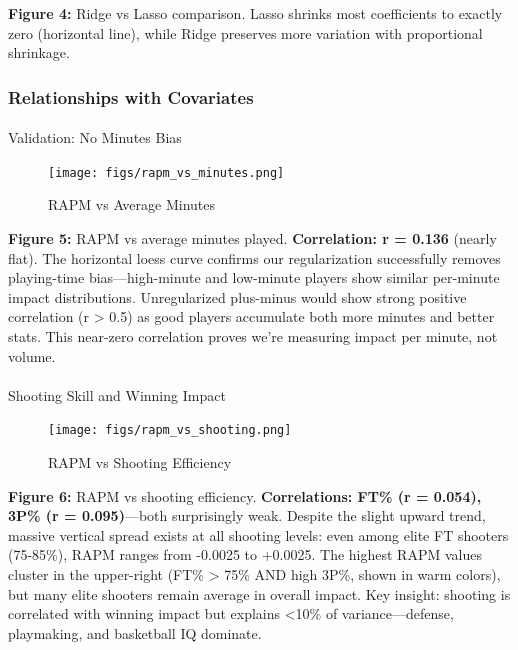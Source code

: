\documentclass[
  letterpaper,
  DIV=11,
  numbers=noendperiod]{scrartcl}
\makeatletter
\let\oldparagraph\paragraph
\renewcommand{\paragraph}{
    \@ifstar
      \xxxParagraphStar
      \xxxParagraphNoStar
  }
\newcommand{\xxxParagraphStar}[1]{\oldparagraph*{#1}\mbox{}}
\newcommand{\xxxParagraphNoStar}[1]{\oldparagraph{#1}\mbox{}}
\makeatother
\begin{document}
\textbf{Figure 4:} Ridge vs Lasso comparison. Lasso shrinks most
coefficients to exactly zero (horizontal line), while Ridge preserves
more variation with proportional shrinkage.

\subsubsection{Relationships with
Covariates}\label{relationships-with-covariates}

\paragraph{Validation: No Minutes
Bias}\label{validation-no-minutes-bias}

\begin{figure}[H]

{\centering \texttt{[image: figs/rapm\_vs\_minutes.png]}

}

\caption{RAPM vs Average Minutes}

\end{figure}%

\textbf{Figure 5:} RAPM vs average minutes played. \textbf{Correlation:
r = 0.136} (nearly flat). The horizontal loess curve confirms our
regularization successfully removes playing-time bias---high-minute and
low-minute players show similar per-minute impact distributions.
Unregularized plus-minus would show strong positive correlation (r
\textgreater{} 0.5) as good players accumulate both more minutes and
better stats. This near-zero correlation proves we're measuring impact
per minute, not volume.

\paragraph{Shooting Skill and Winning
Impact}\label{shooting-skill-and-winning-impact}

\begin{figure}[H]

{\centering \texttt{[image: figs/rapm\_vs\_shooting.png]}

}

\caption{RAPM vs Shooting Efficiency}

\end{figure}%

\textbf{Figure 6:} RAPM vs shooting efficiency. \textbf{Correlations:
FT\% (r = 0.054), 3P\% (r = 0.095)}---both surprisingly weak. Despite
the slight upward trend, massive vertical spread exists at all shooting
levels: even among elite FT shooters (75-85\%), RAPM ranges from -0.0025
to +0.0025. The highest RAPM values cluster in the upper-right (FT\%
\textgreater{} 75\% AND high 3P\%, shown in warm colors), but many elite
shooters remain average in overall impact. Key insight: shooting is
correlated with winning impact but explains \textless10\% of
variance---defense, playmaking, and basketball IQ dominate.
\end{document}
